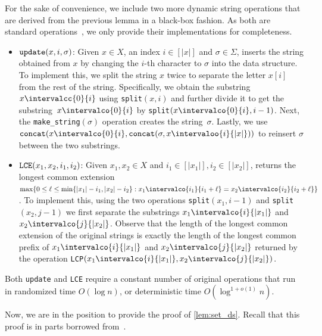 \documentclass[10pt,a4paper]{article}
\DeclarePairedDelimiter\set{\lbrace}{\rbrace}
\newcommand\Oo{O}
\newcommand{\Op}[1]{{\normalfont\texttt{#1}}}
\begin{document}
For the sake of convenience, we include two more dynamic string operations that are derived from the previous lemma in a black-box fashion.
As both are standard operations~\cite{GawrychowskiKKL18}, we only provide their implementations for completeness. 
\smallskip
\begin{itemize}
    \item $\Op{update}(x, i, \sigma)$: Given $x \in X$, an index $i \in [|x|]$ and $\sigma \in \Sigma$, inserts the string obtained from $x$ by changing the $i$-th character to $\sigma$ into the data structure. To implement this, we split the string $x$ twice to separate the letter $x[i]$ from the rest of the string.
    Specifically, we obtain the substring $x\intervalcc{0}{i}$ using \Op{split}$(x,i)$ and further divide it to get the substring~$x\intervalco{0}{i}$ by \Op{split}$(x\intervalco{0}{i}, i-1)$.
    Next, the \Op{make\_string}$(\sigma)$ operation creates the string~$\sigma$.
    Lastly, we use $\Op{concat}(x\intervalco{0}{i}, \Op{concat}(\sigma, x\intervaloo{i}{|x|}))$ to reinsert $\sigma$ between the two substrings.
    \item $\Op{LCE}(x_1, x_2, i_1,i_2)$: Given $x_1, x_2 \in X$ and $i_1 \in [|x_1|], i_2 \in [|x_2|]$, returns the longest common extension $\max\set{0 \le \ell \leq \min\set{|x_1| - i_1, |x_2| - i_2} : x_1\intervalco{i_1}{i_1 + \ell} = x_2\intervalco{i_2}{i_2 + \ell}}$. To implement this, using the two operations \Op{split}$(x_1,i-1)$ and \Op{split}$(x_2,j-1)$ we first separate the substrings $x_1\intervalco{i}{|x_1|}$ and $x_2\intervalco{j}{ |x_2|}$.
    Observe that the length of the longest common extension of the original strings is exactly the length of the longest common prefix of $x_1\intervalco{i}{|x_1|}$ and $x_2\intervalco{j}{ |x_2|}$ returned by the operation \Op{LCP}$(x_1\intervalco{i}{|x_1|}, x_2\intervalco{j}{ |x_2|})$.
\end{itemize}
\smallskip
Both \Op{update} and \Op{LCE} require a constant number of original operations that run in randomized time $\Oo(\log n)$, or deterministic time $\Oo(\log^{1 + o(1)}n)$.

Now, we are in the position to provide the proof of \cref{lem:set_ds}. Recall that this proof is in parts borrowed from~\cite{AxiotisBBJNTW21,CardinalI21}. 
\end{document}

